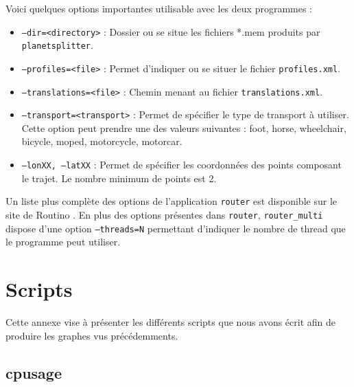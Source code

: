 \begin{appendices}
  Voici quelques options importantes utilisable avec les deux programmes : \\
  
  \begin{itemize}
    \item \texttt{--dir=<directory>} : Dossier ou se situe les fichiers *.mem
      produits par \texttt{planetsplitter}.
    \item \texttt{--profiles=<file>} : Permet d'indiquer ou se situer le 
      fichier \texttt{profiles.xml}.
    \item \texttt{--translations=<file>} : Chemin menant au fichier 
      \texttt{translations.xml}.
    \item \texttt{--transport=<transport>} : Permet de spécifier le type de 
      transport à utiliser. Cette option peut prendre une des valeurs suivantes 
      : foot, horse, wheelchair, bicycle, moped, motorcycle, motorcar.
    \item \texttt{--lonXX, --latXX} : Permet de spécifier les coordonnées des 
      points composant le trajet. Le nombre minimum de points est 2. \\
  \end{itemize}

  Un liste plus complète des options de l'application \texttt{router} est
  disponible sur le site de Routino \cite{bishop_routino_????}. En plus des 
  options présentes dans \texttt{router}, \texttt{router\_multi} dispose d'une 
  option \texttt{--threads=N} permettant d'indiquer le nombre de thread que le 
  programme peut utiliser.
  
  \section{Scripts}
  \label{ann:scripts}
  
  Cette annexe vise à présenter les différents scripts que nous avons écrit 
  afin de produire les graphes vus précédemments.

  \subsection{cpusage}
  \label{ann:cpusage}
  

\end{appendices}
